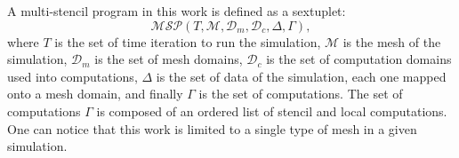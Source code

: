 A multi-stencil program in this work is defined as a sextuplet:
\begin{equation} 
\mathcal{MSP}(T,\mathcal{M},\mathcal{D}_m,\mathcal{D}_c,\Delta,\Gamma),
\label{eq:msp}
\end{equation}
where $T$ is the set of time iteration to run the simulation, $\mathcal{M}$ is the mesh of the simulation, $\mathcal{D}_m$ is the set of mesh domains, $\mathcal{D}_c$ is the set of computation domains used into computations, $\Delta$ is the set of data of the simulation, each one mapped onto a mesh domain, and finally $\Gamma$ is the set of computations. The set of computations $\Gamma$ is composed of an ordered list of stencil and local computations. One can notice that this work is limited to a single type of mesh in a given simulation.





